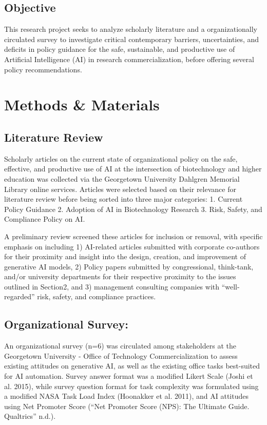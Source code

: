 \documentclass[
]{article}
\begin{document}
\subsection{Objective}\label{objective}

This research project seeks to analyze scholarly literature and a
organizationally circulated survey to investigate critical contemporary
barriers, uncertainties, and deficits in policy guidance for the safe,
sustainable, and productive use of Artificial Intelligence (AI) in
research commercialization, before offering several policy
recommendations.

\section{Methods \& Materials}\label{methods-materials}

\subsection{Literature Review}\label{literature-review}

Scholarly articles on the current state of organizational policy on the
safe, effective, and productive use of AI at the intersection of
biotechnology and higher education was collected via the Georgetown
University Dahlgren Memorial Library online services. Articles were
selected based on their relevance for literature review before being
sorted into three major categories: 1. Current Policy Guidance 2.
Adoption of AI in Biotechnology Research 3. Risk, Safety, and Compliance
Policy on AI.

A preliminary review screened these articles for inclusion or removal,
with specific emphasis on including 1) AI-related articles submitted
with corporate co-authors for their proximity and insight into the
design, creation, and improvement of generative AI models, 2) Policy
papers submitted by congressional, think-tank, and/or university
departments for their respective proximity to the issues outlined in
Section2, and 3) management consulting companies with ``well-regarded''
risk, safety, and compliance practices.

\subsection{Organizational Survey:}\label{organizational-survey}

An organizational survey (n=6) was circulated among stakeholders at the
Georgetown University - Office of Technology Commercialization to assess
existing attitudes on generative AI, as well as the existing office
tasks best-suited for AI automation. Survey answer format was a modified
Likert Scale (Joshi et al. 2015), while survey question format for task
complexity was formulated using a modified NASA Task Load Index
(Hoonakker et al. 2011), and AI attitudes using Net Promoter Score
({``Net Promoter Score ({NPS}): The Ultimate Guide. Qualtrics''} n.d.).
\end{document}
